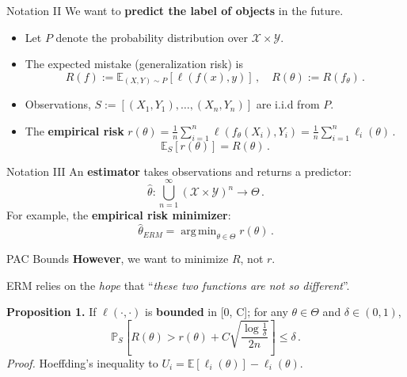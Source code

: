 \documentclass[aspectratio=159]{beamer}
\DeclareMathOperator*{\argmin}{arg\,min}
\begin{document}
    \begin{frame}{Notation II}
        We want to \textbf{predict the label of objects} in the future.
        \begin{itemize}[<+->]
            \item Let \(P\) denote the probability distribution over \(\mathcal{X} \times \mathcal{Y}\). 
            \item The expected mistake (generalization risk) is 
            \[
                R(f) := \mathbb{E}_{(X, Y) \sim P}[\ell(f(x), y)]\,, \quad R(\theta) := R(f_\theta)\,.
            \]
            \item Observations, \(S := [(X_1, Y_1),\dots , (X_n, Y_n)] \) are i.i.d from \(P\).
            \item The \textbf{empirical risk} \(r(\theta) = \tfrac{1}{n}\sum_{i=1}^n \ell(f_\theta(X_i), Y_i) = \tfrac{1}{n}\sum_{i=1}^n \ell_i(\theta)\)\,.
            \[\mathbb{E}_{S}[r(\theta)] = R(\theta)\,.\]
        \end{itemize}
    \end{frame}
    \begin{frame}{Notation III}
            An \textbf{estimator} takes observations and returns a predictor:
            \[
                \hat{\theta}: \bigcup_{n=1}^{\infty}(\mathcal{X} \times \mathcal{Y})^n \to \Theta\,.
            \]
            For example, the \textbf{empirical risk minimizer}:
            \[
                \hat{\theta}_{ERM} = \argmin_{\theta \in \Theta} r(\theta)\,.
            \]
    \end{frame}

    \begin{frame}{PAC Bounds}
        \textbf{However}, we want to minimize \(R\), not \(r\). \pause

        ERM relies on the \textit{hope} that ``\textit{these two functions are not so different}''. \pause

        \textbf{Proposition 1.} If \(\ell(\cdot, \cdot)\) is \textbf{bounded} in [0, C]; for any \(\theta \in \Theta\) and \(\delta \in (0,1)\), 
        \[
        \mathbb{P}_{S}\left[ R(\theta) > r(\theta) + C\sqrt{\frac{\log \frac{1}{\delta}}{2n}} \right] \leq \delta \,.
        \]  
        \textit{Proof. } Hoeffding’s inequality to \(U_i = \mathbb{E}[\ell_i(\theta)] - \ell_i(\theta)\).
    \end{frame}
\end{document}
